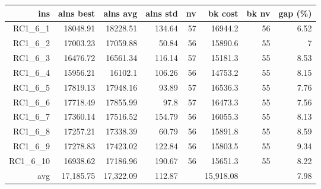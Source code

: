   \begin{table}[caption={Kết quả đo với tập HG\_RC\_1\_6 600 yêu cầu}, label=exp:HGRC16]
    \small
    \centering
    \begin{tabular}{rrrrrrrr}
    \hline
    ins & alns best & alns avg & alns std & nv & bk cost & bk nv & gap (\%) \\ \hline
    RC1\_6\_1 & 18048.91 & 18228.51 & 134.64 & 57 & 16944.2 & 56 & 6.52 \\ \hline
    RC1\_6\_2 & 17003.23 & 17059.88 & 50.84 & 56 & 15890.6 & 55 & 7 \\ \hline
    RC1\_6\_3 & 16476.72 & 16561.34 & 116.14 & 57 & 15181.3 & 55 & 8.53 \\ \hline
    RC1\_6\_4 & 15956.21 & 16102.1 & 106.26 & 56 & 14753.2 & 55 & 8.15 \\ \hline
    RC1\_6\_5 & 17819.13 & 17948.16 & 93.89 & 57 & 16536.3 & 55 & 7.76 \\ \hline
    RC1\_6\_6 & 17718.49 & 17855.99 & 97.8 & 57 & 16473.3 & 55 & 7.56 \\ \hline
    RC1\_6\_7 & 17360.14 & 17516.52 & 154.79 & 56 & 16055.3 & 55 & 8.13 \\ \hline
    RC1\_6\_8 & 17257.21 & 17338.39 & 60.79 & 56 & 15891.8 & 55 & 8.59 \\ \hline
    RC1\_6\_9 & 17278.83 & 17423.02 & 122.84 & 56 & 15803.5 & 55 & 9.34 \\ \hline
    RC1\_6\_10 & 16938.62 & 17186.96 & 190.67 & 56 & 15651.3 & 55 & 8.22 \\ \hline
    avg & 17,185.75 & 17,322.09 & 112.87 & & 15,918.08 & & 7.98 \\ \hline
    \end{tabular}
  \end{table}

